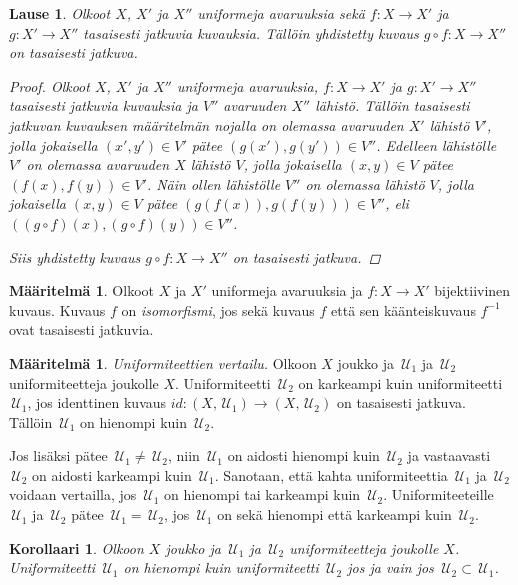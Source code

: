 \documentclass[12pt,a4paper,leqno]{report}
\newcommand{\U}{\,\mathcal{U}}
\theoremstyle{plain}
\newtheorem{lause}[equation]{Lause}
\newtheorem{kor}[equation]{Korollaari}
\theoremstyle{definition}
\newtheorem{maar}[equation]{Määritelmä}
\theoremstyle{remark}
\begin{document}
\begin{lause}
Olkoot $X$, $X'$ ja $X''$ uniformeja avaruuksia 
sekä $f\colon X\rightarrow X'$ ja $g\colon X'\rightarrow X''$ 
tasaisesti jatkuvia kuvauksia. 
Tällöin yhdistetty kuvaus $g\circ f\colon X\rightarrow X''$ on tasaisesti jatkuva.
\begin{proof}
Olkoot $X$, $X'$ ja $X''$ uniformeja avaruuksia, 
$f\colon X\rightarrow X'$ ja $g\colon X'\rightarrow X''$ tasaisesti jatkuvia kuvauksia ja 
$V''$ avaruuden $X''$ lähistö. 
Tällöin tasaisesti jatkuvan kuvauksen määritelmän nojalla 
on olemassa avaruuden $X'$ lähistö $V'$, 
jolla jokaisella $(x',y')\in V'$ pätee $ (g(x'),g(y'))\in V''$.
Edelleen lähistölle $V'$ on olemassa avaruuden $X$ lähistö $V$, 
jolla jokaisella $(x,y)\in V$ pätee $ (f(x),f(y))\in V'$.
Näin ollen lähistölle $V''$ on olemassa lähistö $V$, 
jolla jokaisella $(x,y)\in V$ pätee $ (g(f(x)),g(f(y)))\in V''$, 
eli $ ((g\circ f)(x),(g\circ f)(y))\in V''$.

Siis yhdistetty kuvaus $g\circ f\colon X\rightarrow X''$ on tasaisesti jatkuva.
\end{proof}
\end{lause}
\begin{maar}
Olkoot $X$ ja $X'$ uniformeja avaruuksia 
ja $f\colon X\rightarrow X'$ bijektiivinen kuvaus. 
Kuvaus $f$ on \emph{isomorfismi}, jos sekä kuvaus $f$ että sen 
käänteiskuvaus $f^{-1}$ ovat tasaisesti jatkuvia.
\end{maar}
\begin{maar}\label{uniformi_vertailu}
\emph{Uniformiteettien vertailu.} 
Olkoon $X$ joukko ja $\U_1$ ja $\U_2$ uniformiteetteja joukolle $X$. 
Uniformiteetti $\U_2$ on karkeampi kuin uniformiteetti $\U_1$, 
jos identtinen kuvaus $id\colon (X,\U_1)\rightarrow (X,\U_2)$ on tasaisesti jatkuva. Tällöin $\U_1$ on hienompi kuin $\U_2$. 

Jos lisäksi pätee $\U_1\neq\U_2$, niin $\U_1$ on aidosti hienompi kuin $\U_2$ ja vastaavasti $\U_2$ on aidosti karkeampi kuin $\U_1$. 
Sanotaan, että kahta uniformiteettia $\U_1$ ja $\U_2$ voidaan vertailla, 
jos $\U_1$ on hienompi tai karkeampi kuin $\U_2$. 
Uniformiteeteille $\U_1$ ja $\U_2$ pätee $\U_1=\U_2$, 
jos $\U_1$ on sekä hienompi että karkeampi kuin $\U_2$.
\end{maar}
\begin{kor}
Olkoon $X$ joukko ja $\U_1$ ja $\U_2$ uniformiteetteja joukolle $X$. 
Uniformiteetti $\U_1$ on hienompi kuin uniformiteetti $\U_2$ jos ja vain jos 
$\U_2\subset\U_1$.
\end{kor}
\end{document}
